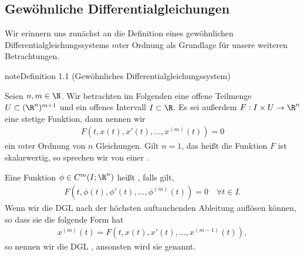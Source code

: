\documentclass[letterpaper,10pt,german]{jupyterBook}
\begin{document}
\subsection{Gewöhnliche Differentialgleichungen}
\label{\detokenize{ode/repetition:gewohnliche-differentialgleichungen}}
\sphinxAtStartPar
Wir erinnern uns zunächst an die Definition eines gewöhnlichen Differentialgleichungssystems \(m\)\sphinxhyphen{}ter Ordnung als Grundlage für unsere weiteren Betrachtungen.
\label{ode/repetition:def:DGL}
\begin{sphinxadmonition}{note}{Definition 1.1 (Gewöhnliches Differentialgleichungssystem)}



\sphinxAtStartPar
Seien \(n,m \in \N\).
Wir betrachten im Folgenden eine offene Teilmenge \(U\subset (\R^n)^{m+1}\) und ein offenes Intervall \(I\subset\R\).
Es sei außerdem \(F:I\times U\rightarrow\R^n\) eine stetige Funktion, dann nennen wir
\begin{equation}\label{equation:ode/repetition:eq:DGL}
\begin{split}F(t,x(t),x'(t),\ldots,x^{(m)}(t)) = 0\end{split}
\end{equation}
\sphinxAtStartPar
ein  \(m\)\sphinxhyphen{}ter Ordnung von \(n\) Gleichungen.
Gilt \(n=1\), das heißt die Funktion \(F\) ist skalarwertig, so sprechen wir von einer .

\sphinxAtStartPar
Eine Funktion \(\phi\in C^m(I;\R^n)\) heißt , falls gilt,
\begin{equation*}
\begin{split}F(t, \phi(t), \phi'(t), \ldots, \phi^{(m)}(t)) = 0 \quad \forall t\in I.\end{split}
\end{equation*}
\sphinxAtStartPar
Wenn wir die DGL nach der höchsten auftauchenden Ableitung auflösen können, so dass sie die folgende Form hat
\begin{equation*}
\begin{split}x^{(m)}(t) = F(t,x(t),x'(t),\ldots,x^{(m-1)}(t)),\end{split}
\end{equation*}
\sphinxAtStartPar
so nennen wir die DGL , ansonsten wird sie  genannt.
\end{sphinxadmonition}
\end{document}
